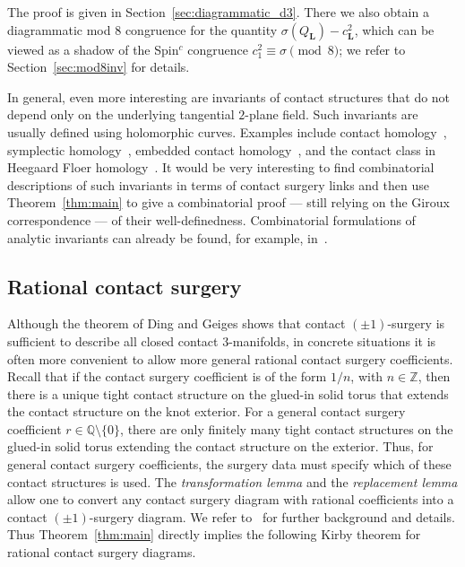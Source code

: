 \documentclass{amsart}
\numberwithin{equation}{section}
\numberwithin{figure}{section}
\theoremstyle{definition}
\theoremstyle{remark}
\begin{document}
The proof is given in Section~\ref{sec:diagrammatic_d3}. There we also obtain a diagrammatic mod \(8\) congruence for the quantity \(\sigma(Q_{\boldsymbol L})-c_{\boldsymbol L}^2\), which can be viewed as a shadow of the Spin\(^c\) congruence \(c_1^2\equiv\sigma\pmod 8\); we refer to Section~\ref{sec:mod8inv} for details.

In general, even more interesting are invariants of contact structures that do not depend only on the underlying tangential $2$-plane field. Such invariants are usually defined using holomorphic curves. Examples include contact homology~\cite{Contact_homology}, symplectic homology~\cite{symplectic_homology}, embedded contact homology~\cite{ECH}, and the contact class in Heegaard Floer homology~\cite{contact_class}. It would be very interesting to find combinatorial descriptions of such invariants in terms of contact surgery links and then use Theorem~\ref{thm:main} to give a combinatorial proof --- still relying on the Giroux correspondence --- of their well-definedness. Combinatorial formulations of analytic invariants can already be found, for example, in~\cite{Avdek13,BEE,contact_class_algo,Chekanov}.

\subsection{Rational contact surgery}
Although the theorem of Ding and Geiges shows that contact $(\pm1)$-surgery is sufficient to describe all closed contact $3$-manifolds, in concrete situations it is often more convenient to allow more general rational contact surgery coefficients. Recall that if the contact surgery coefficient is of the form $1/n$, with $n\in\mathbb{Z}$, then there is a unique tight contact structure on the glued-in solid torus that extends the contact structure on the knot exterior. 
For a general contact surgery coefficient $r\in\mathbb Q\setminus\{0\}$, there are only finitely many tight contact structures on the glued-in solid torus extending the contact structure on the exterior. Thus, for general contact surgery coefficients, the surgery data must specify which of these contact structures is used. 
The \textit{transformation lemma} and the \textit{replacement lemma} allow one to convert any contact surgery diagram with rational coefficients into a contact $(\pm1)$-surgery diagram. We refer to~\cite{Honda_classification,Ding_Geiges_fillable,Ding_Geiges_Stipsicz,Kegel_thesis,Etnyre_Kegel_Onaran} for further background and details. Thus Theorem~\ref{thm:main} directly implies the following Kirby theorem for rational contact surgery diagrams.
\end{document}
